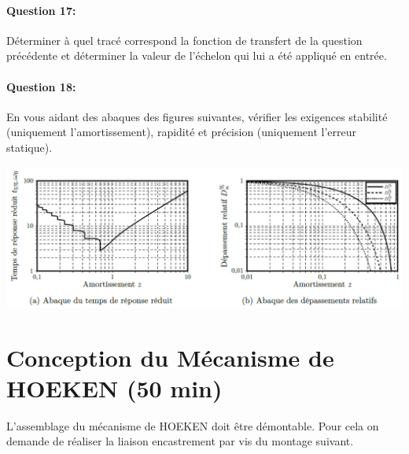 \paragraph{Question 17:} Déterminer à quel tracé correspond la fonction de transfert de la question précédente et déterminer la valeur de l'échelon qui lui a été appliqué en entrée.


\paragraph{Question 18:} En vous aidant des abaques des figures suivantes, vérifier les exigences \og stabilité \fg (uniquement l'amortissement), \og rapidité \fg et \og précision \fg (uniquement l'erreur statique).

\begin{center}
 \includegraphics[width=0.8\linewidth]{img/Figure22}
\end{center}

\section{Conception du Mécanisme de HOEKEN (50 min)}

L'assemblage du mécanisme de HOEKEN doit être démontable. Pour cela on demande de réaliser la liaison encastrement par vis du montage suivant.

